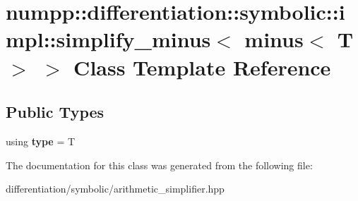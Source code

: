 \hypertarget{classnumpp_1_1differentiation_1_1symbolic_1_1impl_1_1simplify__minus_3_01minus_3_01T_01_4_01_4}{}\section{numpp\+:\+:differentiation\+:\+:symbolic\+:\+:impl\+:\+:simplify\+\_\+minus$<$ minus$<$ T $>$ $>$ Class Template Reference}
\label{classnumpp_1_1differentiation_1_1symbolic_1_1impl_1_1simplify__minus_3_01minus_3_01T_01_4_01_4}
\subsection*{Public Types}
\begin{DoxyCompactItemize}
\item 
\mbox{\label{classnumpp_1_1differentiation_1_1symbolic_1_1impl_1_1simplify__minus_3_01minus_3_01T_01_4_01_4_aaba3eaf2b302ef0543a580225077754f}} 
using {\bfseries type} = T
\end{DoxyCompactItemize}


The documentation for this class was generated from the following file\+:\begin{DoxyCompactItemize}
\item 
differentiation/symbolic/arithmetic\+\_\+simplifier.\+hpp\end{DoxyCompactItemize}
